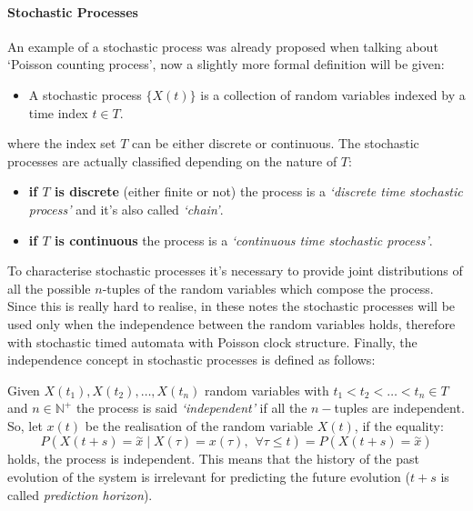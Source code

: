\documentclass[12pt,a4paper]{article}
\begin{document}
\paragraph{Stochastic Processes}
An example of a stochastic process was already proposed when talking about `Poisson counting process', now a slightly more formal definition will be given:
\begin{itemize}
\item A stochastic process $\{X(t)\}$ is a collection of random variables indexed by a time index $t \in T$.
\end{itemize}
where the index set $T$ can be either discrete or continuous.
The stochastic processes are actually classified depending on the nature of $T$:
\begin{itemize}
\item \textbf{if $T$ is discrete} (either finite or not) the process is a \emph{`discrete time stochastic process'} 
and it's also called \emph{`chain'}.
\item \textbf{if $T$ is continuous} the process is a \emph{`continuous time stochastic process'}.
\end{itemize}
To characterise stochastic processes it's necessary to provide joint distributions of all the possible $n$-tuples of the random variables which compose the process. Since this is really hard to realise, in these notes the stochastic processes will be used
only when the independence between the random variables holds, therefore with stochastic timed automata with Poisson clock structure. Finally, the independence concept in stochastic processes is defined as follows:

\bigskip
\noindent 
Given $X(t_1), X(t_2),\dots, X(t_n)$ random variables with $t_1<t_2<\dots<t_n \in T$ and $n\in\mathbb{N}^+$ the process is said \textit{`independent'} if all the $n-$tuples are independent. So, let $x(t)$ be the realisation of the random variable $X(t)$, if the equality:
$$
P\left(X\left(t+s\right)=\overset{\sim}{x} \mid X\left(\tau\right)=
x\left(\tau\right),\hspace{5pt}\forall\tau\leq t\right)=
P\left(X\left(t+s\right)=\overset{\sim}{x} \right)
$$
holds, the process is independent. This means that the history of the past evolution of the system is irrelevant for predicting the future evolution ($t+s$ is called \textit{prediction horizon}).
\end{document}
